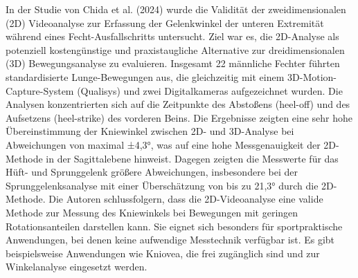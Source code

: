 \noindent In der Studie von Chida et al. (2024) wurde die Validität der zweidimensionalen (2D) Videoanalyse zur Erfassung der Gelenkwinkel der unteren Extremität während eines Fecht-Ausfallschritts untersucht. Ziel war es, die 2D-Analyse als potenziell kostengünstige und praxistaugliche Alternative zur dreidimensionalen (3D) Bewegungsanalyse zu evaluieren. Insgesamt 22 männliche Fechter führten standardisierte Lunge-Bewegungen aus, die gleichzeitig mit einem 3D-Motion-Capture-System (Qualisys) und zwei Digitalkameras aufgezeichnet wurden. Die Analysen konzentrierten sich auf die Zeitpunkte des Abstoßens (heel-off) und des Aufsetzens (heel-strike) des vorderen Beins. Die Ergebnisse zeigten eine sehr hohe Übereinstimmung der Kniewinkel zwischen 2D- und 3D-Analyse bei Abweichungen von maximal ±4,3°, was auf eine hohe Messgenauigkeit der 2D-Methode in der Sagittalebene hinweist. Dagegen zeigten die Messwerte für das Hüft- und Sprunggelenk größere Abweichungen, insbesondere bei der Sprunggelenksanalyse mit einer Überschätzung von bis zu 21,3° durch die 2D-Methode. Die Autoren schlussfolgern, dass die 2D-Videoanalyse eine valide Methode zur Messung des Kniewinkels bei Bewegungen mit geringen Rotationsanteilen darstellen kann. Sie eignet sich besonders für sportpraktische Anwendungen, bei denen keine aufwendige Messtechnik verfügbar ist. \cite{videoanalysis2024}
\nointent Es gibt beispielsweise Anwendungen wie Kniovea, die frei zugänglich sind und zur Winkelanalyse eingesetzt werden. \cite{Kniovea}
